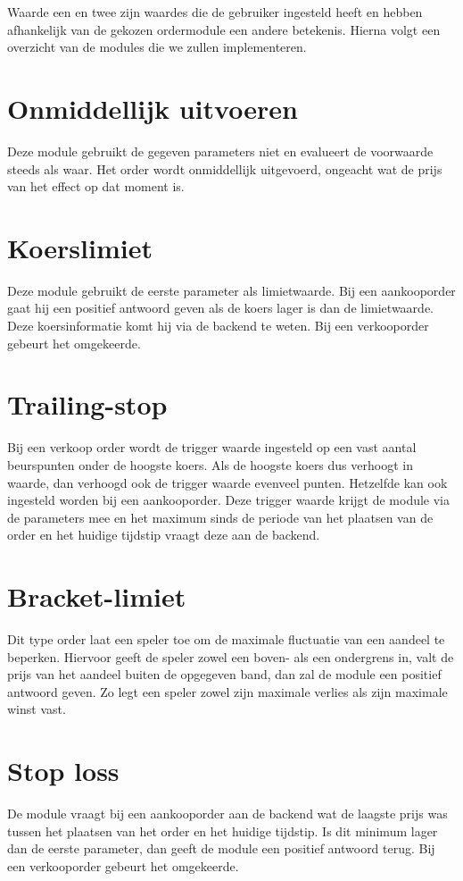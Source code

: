 Waarde een en twee zijn waardes die de gebruiker ingesteld heeft en hebben afhankelijk van de gekozen ordermodule een andere betekenis.
Hierna volgt een overzicht van de modules die we zullen implementeren.

\section{Onmiddellijk uitvoeren}
Deze module gebruikt de gegeven parameters niet en evalueert de voorwaarde steeds als waar. Het order wordt onmiddellijk uitgevoerd, ongeacht wat de prijs van het effect op dat moment is.

\section{Koerslimiet}
Deze module gebruikt de eerste parameter als limietwaarde. Bij een aankooporder gaat hij een positief antwoord geven als de koers lager is dan de limietwaarde. Deze koersinformatie komt hij via de backend te weten. Bij een verkooporder gebeurt het omgekeerde. 

\section{Trailing-stop}
Bij een verkoop order wordt de trigger waarde ingesteld op een vast aantal beurspunten onder de hoogste koers. Als de hoogste koers dus verhoogt in waarde, dan verhoogd ook de trigger waarde evenveel punten. Hetzelfde kan ook ingesteld worden bij een aankooporder. Deze trigger waarde krijgt de module via de parameters mee en het maximum sinds de periode van het plaatsen van de order en het huidige tijdstip vraagt deze aan de backend.

\section{Bracket-limiet}
Dit type order laat een speler toe om de maximale fluctuatie van een aandeel te beperken. Hiervoor geeft de speler zowel een boven- als een ondergrens in, valt de prijs van het aandeel buiten de opgegeven band, dan zal de module een positief antwoord geven. Zo legt een speler zowel zijn maximale verlies als zijn maximale winst vast.

\section{Stop loss}
De module vraagt bij een aankooporder aan de backend wat de laagste prijs was tussen het plaatsen van het order en het huidige tijdstip. Is dit minimum lager dan de eerste parameter, dan geeft de module een positief antwoord terug. Bij een verkooporder gebeurt het omgekeerde.

